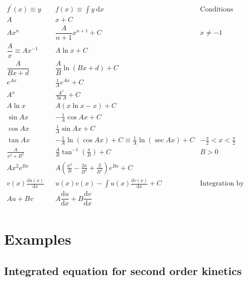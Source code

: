 \documentclass[
]{book}
\begin{document}
\begin{equation*}
\begin{array}{cccc}
f^{\prime}(x) \equiv y & & f(x) \equiv \int y ~\textrm{d}x & \textrm{Conditions}\\
  \hline
  \hline
A & & x + C \\ 
Ax^n & & \dfrac{A}{n+1}x^{n+1}+ C & x \neq -1\\ 
\dfrac{A}{x} \equiv A x^{-1} & &  A \ln x + C\\  
\dfrac{A}{Bx+ d} & & \dfrac{A}{B} \ln(Bx + d) +C\\ 
e^{Ax} & &\frac{1}{A} e^{Ax} + C\\
A^x && \frac{A^x}{\ln A} +C\\
A \ln x & & A \left( x \ln x - x \right)+ C\\

\sin Ax & &-\frac{1}{A}\cos Ax + C\\ 
\cos Ax & &\frac{1}{A}\sin Ax + C\\
\tan Ax & &-\frac{1}{A}\ln(\cos Ax) + C \equiv \frac{1}{A}\ln(\sec Ax) + C & -\frac{\pi}{2} < x < \frac{\pi}{2}\\

\frac{A}{x^2 + B^2} && \frac{A}{B}\tan^{-1}\left(\frac{x}{B}\right) + C &B>0\\
Ax^2 e^{Bx} && A\left(\frac{x^2}{B} - \frac{2x}{B^2} + \frac{2}{B^3} \right)e^{Bx} +C\\

v(x) \frac{\textrm{d}u(x)}{\textrm{d}x} && u(x)v(x) - \int u(x)\frac{\textrm{d}v(x)}{\textrm{d}x} +C & \textrm{Integration by Parts}\\

Au + Bv & &A\dfrac{\textrm{d}u}{\textrm{d}x} + B\dfrac{\textrm{d}v}{\textrm{d}x} \\
\end{array}
\end{equation*}

\hypertarget{examples-2}{%
\section{Examples}\label{examples-2}}

\hypertarget{integrated-equation-for-second-order-kinetics}{%
\subsection{Integrated equation for second order kinetics}\label{integrated-equation-for-second-order-kinetics}}
\end{document}
